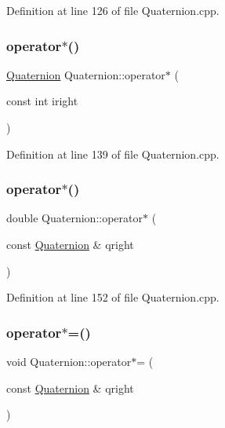 Definition at line 126 of file Quaternion.\+cpp.

\mbox{\label{class_quaternion_afd7dca9b83120d04f030f49a24cdcc25}} 
\subsubsection{\texorpdfstring{operator$\ast$()}{operator*()}\hspace{0.1cm}{\footnotesize\ttfamily [2/3]}}
{\footnotesize\ttfamily \mbox{\hyperlink{class_quaternion}{Quaternion}} Quaternion\+::operator$\ast$ (\begin{DoxyParamCaption}\item[{const int}]{iright }\end{DoxyParamCaption})}



Definition at line 139 of file Quaternion.\+cpp.

\mbox{\label{class_quaternion_a21b49530f9869f4648dc31bdc5adf3dd}} 
\subsubsection{\texorpdfstring{operator$\ast$()}{operator*()}\hspace{0.1cm}{\footnotesize\ttfamily [3/3]}}
{\footnotesize\ttfamily double Quaternion\+::operator$\ast$ (\begin{DoxyParamCaption}\item[{const \mbox{\hyperlink{class_quaternion}{Quaternion}} \&}]{qright }\end{DoxyParamCaption})}



Definition at line 152 of file Quaternion.\+cpp.

\mbox{\label{class_quaternion_a160196d3cffa9c26238a6967c83e4105}} 
\subsubsection{\texorpdfstring{operator$\ast$=()}{operator*=()}}
{\footnotesize\ttfamily void Quaternion\+::operator$\ast$= (\begin{DoxyParamCaption}\item[{const \mbox{\hyperlink{class_quaternion}{Quaternion}} \&}]{qright }\end{DoxyParamCaption})}



